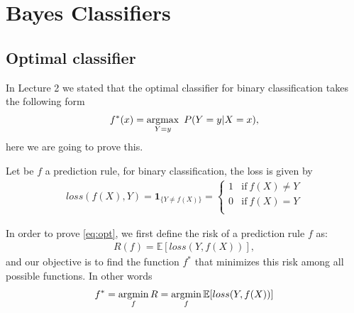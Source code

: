 \section{Bayes Classifiers }

\subsection{Optimal classifier }
In Lecture 2 we stated that the optimal classifier for binary classification takes the following form
\begin{gather}
    f^*(x) = \mathop{\mathrm{argmax}}_{Y=y}~{P}(Y=y|X=x),
    \label{eq:opt}
\end{gather}
here we are going to prove this.

Let be $f$ a prediction rule, for binary classification, the loss is given by
\begin{gather*}
    loss(f(X),Y) = \mathbf{1}_{\{Y\neq f(X)\}} = 
    \begin{cases} 
      1 & \text{if}~f(X)\neq Y \\
      0 & \text{if}~f(X)=Y \\      
   \end{cases}
\end{gather*}

In order to prove \eqref{eq:opt}, we first define the risk of a prediction rule $f$ as:
\begin{gather*}
    R(f)=\mathbb{E}[loss(Y,f(X))],
\end{gather*}
and our objective is to find the function $f^*$ that minimizes this risk among all possible functions. In other words
\begin{gather*}
    f^* = \mathop{\mathrm{argmin}}_{f}{R} = \mathop{\mathrm{argmin}}_{f}\mathbb{E}[loss(Y,f(X))]
\end{gather*}

